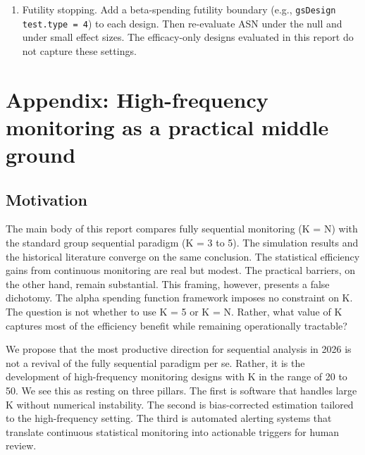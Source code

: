 \documentclass[
  11pt,
]{article}
\begin{document}
\begin{enumerate}
  anytime-valid procedure. The comparator would be a
  mixture sequential probability ratio test or a
  confidence-sequence procedure\textsuperscript{--}. The designs would be matched on
  type I error and power. Such a study would establish
  whether the appendix's high-frequency
  spending-function designs remain competitive with
  the anytime-valid literature on ASN and estimator
  bias.
\item
  Futility stopping. Add a beta-spending futility
  boundary (e.g., \texttt{gsDesign} \texttt{test.type\ =\ 4}) to each
  design. Then re-evaluate ASN under the null and
  under small effect sizes. The efficacy-only designs
  evaluated in this report do not capture these
  settings.
\end{enumerate}

\newpage
\appendix

\section{Appendix: High-frequency monitoring as a practical middle ground}\label{appendix-high-frequency-monitoring-as-a-practical-middle-ground}

\subsection{Motivation}\label{motivation}

The main body of this report compares fully sequential
monitoring (K = N) with the standard group sequential
paradigm (K = 3 to 5). The simulation
results and the historical literature converge on the
same conclusion. The statistical efficiency gains from
continuous monitoring are real but modest. The
practical barriers, on the other hand, remain
substantial. This framing,
however, presents a false dichotomy. The alpha spending
function framework imposes no constraint on K. The
question is not whether to use K = 5 or K = N. Rather,
what value of K captures most of the efficiency benefit
while remaining operationally tractable?

We propose that the most productive direction for
sequential analysis in 2026 is not a revival of the
fully sequential paradigm per se. Rather, it is the
development of high-frequency monitoring designs with K
in the range of 20 to 50. We see this as resting on
three pillars. The first is software that handles
large K without numerical instability. The second is
bias-corrected estimation tailored to the
high-frequency setting. The third is automated alerting
systems that translate continuous statistical
monitoring into actionable triggers for human review.
\end{document}
